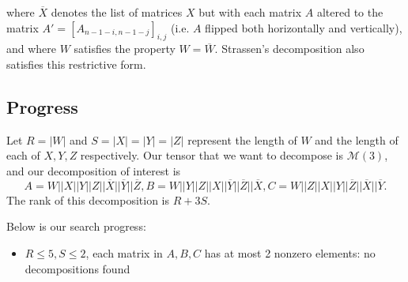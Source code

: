 \documentclass{article}
\begin{document}
where $\overline{X}$ denotes the list of matrices $X$ but with each matrix $A$ altered to the matrix $A'=[A_{n-1-i,n-1-j}]_{i,j}$ (i.e. $A$ flipped both horizontally and vertically), and where $W$ satisfies the property $W=\overline{W}$. Strassen's decomposition also satisfies this restrictive form.

\subsection{Progress}
Let $R=|W|$ and $S=|X|=|Y|=|Z|$ represent the length of $W$ and the length of each of $X,Y,Z$ respectively. Our tensor that we want to decompose is $\mathcal{M}(3)$, and our decomposition of interest is
\[A=W||X||Y||Z||\overline{X}||\overline{Y}||\overline{Z},B=W||Y||Z||X||\overline{Y}||\overline{Z}||\overline{X},C=W||Z||X||Y||\overline{Z}||\overline{X}||\overline{Y}.\]
The rank of this decomposition is $R+3S$.

Below is our search progress:
\begin{itemize}
    \item $R\le 5,S\le 2$, each matrix in $A,B,C$ has at most 2 nonzero elements: no decompositions found
\end{itemize}
\end{document}
